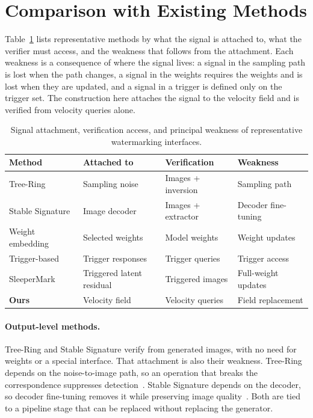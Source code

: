 \documentclass[11pt]{article}
\begin{document}
\FloatBarrier
\section{Comparison with Existing Methods}\label{app:comparison}

Table~\ref{tab:comparison} lists representative methods by what the
signal is attached to, what the verifier must access, and the weakness
that follows from the attachment. Each weakness is a consequence of
where the signal lives: a signal in the sampling path is lost when the
path changes, a signal in the weights requires the weights and is lost
when they are updated, and a signal in a trigger is defined only on the
trigger set. The construction here attaches the signal to the velocity
field and is verified from velocity queries alone.

\begin{table}[!htbp]
\centering
\caption{Signal attachment, verification access, and principal
weakness of representative watermarking interfaces.}
\label{tab:comparison}
\small
\begin{tabular}{@{}llll@{}}
\toprule
Method & Attached to & Verification & Weakness \\
\midrule
Tree-Ring~\cite{wen2023tree}
  & Sampling noise & Images + inversion & Sampling path \\
Stable Signature~\cite{fernandez2023stable}
  & Image decoder & Images + extractor & Decoder fine-tuning~\cite{hu2024unstable} \\
Weight embedding~\cite{uchida2017embedding}
  & Selected weights & Model weights & Weight updates \\
Trigger-based~\cite{adi2018turning,chen2019blackmarks,fei2025high}
  & Trigger responses & Trigger queries & Trigger access \\
SleeperMark~\cite{wang2025sleepermark}
  & Triggered latent residual & Triggered images & Full-weight updates \\
\textbf{Ours}
  & Velocity field & Velocity queries & Field replacement \\
\bottomrule
\end{tabular}
\end{table}

\paragraph{Output-level methods.}
Tree-Ring and Stable Signature verify from generated images, with no
need for weights or a special interface. That attachment is also their
weakness. Tree-Ring depends on the noise-to-image path, so an operation
that breaks the correspondence suppresses
detection~\cite{lin2025crack}. Stable Signature depends on the decoder,
so decoder fine-tuning removes it while preserving image
quality~\cite{hu2024unstable}. Both are tied to a pipeline stage that
can be replaced without replacing the generator.
\end{document}

